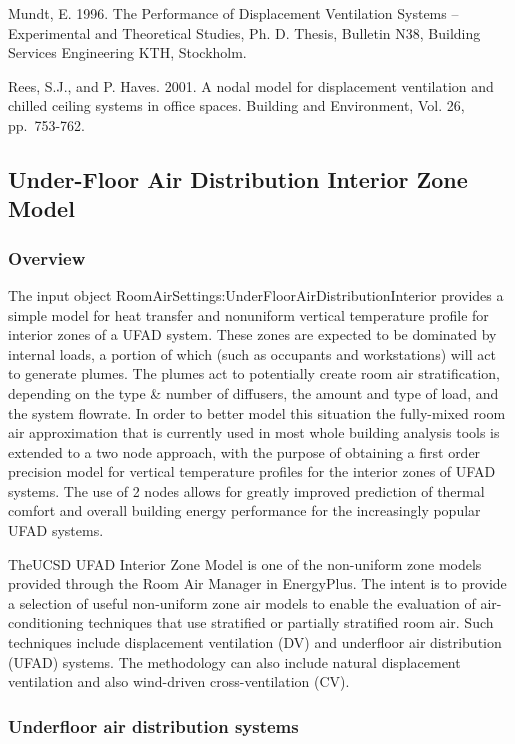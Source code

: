 Mundt, E. 1996. The Performance of Displacement Ventilation Systems -- Experimental and Theoretical Studies, Ph. D. Thesis, Bulletin N38, Building Services Engineering KTH, Stockholm.

Rees, S.J., and P. Haves. 2001. A nodal model for displacement ventilation and chilled ceiling systems in office spaces. Building and Environment, Vol. 26, pp.~753-762.

\subsection{Under-Floor Air Distribution Interior Zone Model}\label{under-floor-air-distribution-interior-zone-model}

\subsubsection{Overview}\label{overview-1-001}

The input object RoomAirSettings:UnderFloorAirDistributionInterior provides a simple model for heat transfer and nonuniform vertical temperature profile for interior zones of a UFAD system. These zones are expected to be dominated by internal loads, a portion of which (such as occupants and workstations) will act to generate plumes. The plumes act to potentially create room air stratification, depending on the type \& number of diffusers, the amount and type of load, and the system flowrate. In order to better model this situation the fully-mixed room air approximation that is currently used in most whole building analysis tools is extended to a two node approach, with the purpose of obtaining a first order precision model for vertical temperature profiles for the interior zones of UFAD systems. The use of 2 nodes allows for greatly improved prediction of thermal comfort and overall building energy performance for the increasingly popular UFAD systems.

TheUCSD UFAD Interior Zone Model is one of the non-uniform zone models provided through the Room Air Manager in EnergyPlus. The intent is to provide a selection of useful non-uniform zone air models to enable the evaluation of air-conditioning techniques that use stratified or partially stratified room air. Such techniques include displacement ventilation (DV) and underfloor air distribution (UFAD) systems. The methodology can also include natural displacement ventilation and also wind-driven cross-ventilation (CV).

\subsubsection{Underfloor air distribution systems}\label{underfloor-air-distribution-systems}

